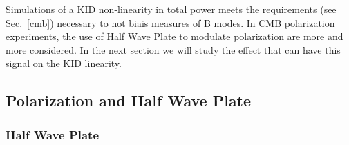 Simulations of a KID non-linearity in total power meets the requirements (see Sec.~\ref{cmb}) necessary to not biais measures of B modes. In CMB polarization experiments, the use of Half Wave Plate to modulate polarization are more and more considered. In the next section we will study the effect that can have this signal on the KID linearity.




\subsection{Polarization and Half Wave Plate}
\subsubsection{Half Wave Plate}

